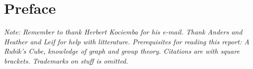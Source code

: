 \chapter*{Preface}
\textit{Note: Remember to thank Herbert Kociemba for his e-mail. Thank Anders and Heather and Leif for help with litterature. Prerequisites for reading this report: A Rubik's Cube, knowledge of graph and group theory. Citations are with square brackets. Trademarks on stuff is omitted.}